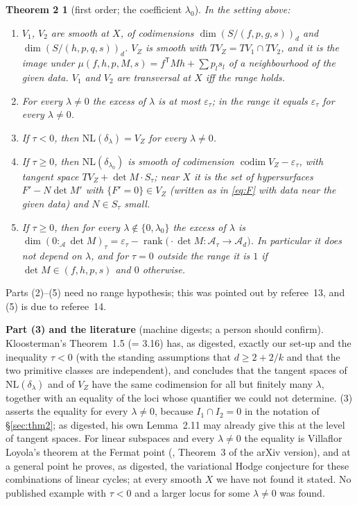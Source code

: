 \documentclass[11pt]{article}
\numberwithin{equation}{section}
\newtheorem*{thm2}{Theorem 2}
\theoremstyle{remark}
\newcommand{\NL}{\mathrm{NL}}
\newcommand{\VZ}{V_Z}
\newcommand{\cA}{\mathcal{A}}
\newcommand{\codim}{\operatorname{codim}}
\newcommand{\T}{\mathsf{T}}
\newcommand{\lz}{\lambda_0}
\newcommand{\et}{\varepsilon_\tau}
\newcommand{\run}[1]{\medskip\noindent\textbf{#1}}
\begin{document}
\begin{thm2}[first order; the coefficient $\lz$]
In the setting above:
\begin{enumerate}
\item $V_1$, $V_2$ are smooth at $X$, of codimensions $\dim(S/(f,p,g,s))_d$ and $\dim(S/(h,p,q,s))_d$. $\VZ$ is
smooth with $T\VZ=TV_1\cap TV_2$, and it is the image under $\mu(f,h,p,M,s)=f^\T Mh+\sum p_ls_l$ of a
neighbourhood of the given data. $V_1$ and $V_2$ are transversal at $X$ iff the range holds.
\item For every $\lambda\ne0$ the excess of $\lambda$ is at most $\et$; in the range it equals $\et$ for every
$\lambda\ne0$.
\item If $\tau<0$, then $\NL(\delta_\lambda)=\VZ$ for every $\lambda\ne0$.
\item If $\tau\ge0$, then $\NL(\delta_{\lz})$ is smooth of codimension $\codim\VZ-\et$, with tangent space
$T\VZ+\det M\cdot S_\tau$; near $X$ it is the set of hypersurfaces $F'-N\det M'$ with $\{F'=0\}\in\VZ$ (written as
in \eqref{eq:F} with data near the given data) and $N\in S_\tau$ small.
\item If $\tau\ge0$, then for every $\lambda\notin\{0,\lz\}$ the excess of $\lambda$ is
$\dim(0:_{\cA}\det M)_\tau=\et-\operatorname{rank}\bigl(\cdot\det M:\cA_\tau\to\cA_d\bigr)$. In particular it does
not depend on $\lambda$, and for $\tau=0$ outside the range it is $1$ if $\det M\in(f,h,p,s)$ and $0$ otherwise.
\end{enumerate}
\end{thm2}

Parts (2)--(5) need no range hypothesis; this was pointed out by referee~13, and (5) is due to referee~14.

\run{Part (3) and the literature} (machine digests; a person should confirm). Kloosterman's Theorem~1.5
(= 3.16) \cite{Kl} has, as digested, exactly our set-up and the inequality $\tau<0$ (with the standing
assumptions that $d\ge2+2/k$ and that the two primitive classes are independent), and concludes that the tangent
spaces of $\NL(\delta_\lambda)$ and of $\VZ$ have the same codimension for all but finitely many $\lambda$,
together with an equality of the loci whose quantifier we could not determine. (3) asserts the equality for
every $\lambda\ne0$, because $I_1\cap I_2=0$ in the notation of \S\ref{sec:thm2}; as digested, his own Lemma~2.11
may already give this at the level of tangent spaces. For linear subspaces and every $\lambda\ne0$ the equality
is Villaflor Loyola's theorem at the Fermat point (\cite{VL}, Theorem~3 of the arXiv version), and at a general
point he proves, as digested, the variational Hodge conjecture for these combinations of linear cycles; at
every smooth $X$ we have not found it stated. No published
example with $\tau<0$ and a larger locus for some $\lambda\ne0$ was found.
\end{document}
